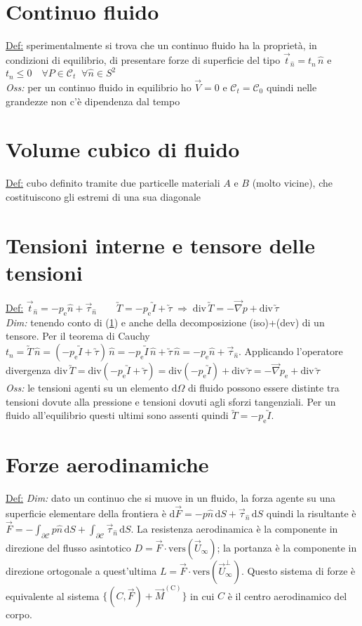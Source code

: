 \documentclass[11pt,a4paper]{report}
\newcommand{\de}{\mathrm d}
\begin{document}
	\section{Continuo fluido} \label{fluido}
	\underline{Def:} sperimentalmente si trova che un continuo fluido ha la proprietà, in condizioni di equilibrio, di presentare forze di superficie del tipo $\vec t_{\hat n}=t_{\hat n}\,\hat n$ e $t_{\hat n}\leq 0\quad\forall P\in\mathcal C_t\;\;\forall \hat n\in S^2$\\
	\textit{Oss:} per un continuo fluido in equilibrio ho $\vec V=0$ e $\mathcal C_t=\mathcal C_0$ quindi nelle grandezze non c'è dipendenza dal tempo
	
	\section{Volume cubico di fluido}
	\underline{Def:} cubo definito tramite due particelle materiali $A$ e $B$ (molto vicine), che costituiscono gli estremi di una sua diagonale
	
	\section{Tensioni interne e tensore delle tensioni}	\label{tensioni fluido}
	\underline{Def:} $\vec t_{\hat n}=-p_\mathrm e \hat n+\vec\tau_{\hat n}\qquad
	\utilde T=-p_\mathrm e\utilde I+\utilde\tau\;\Rightarrow\;\mathrm{div}\,\utilde T=-\vec\nabla p+\mathrm{div}\,\utilde\tau$\\
	\textit{Dim:} tenendo conto di (\ref{fluido}) e anche della decomposizione (iso)+(dev) di un tensore. Per il teorema di Cauchy\\$t_{\hat n}=\utilde T\,\hat n=(-p_\mathrm e\utilde I+\utilde\tau)\,\hat n=-p_\mathrm e\utilde I\,\hat n+\utilde\tau\,\hat n=-p_\mathrm e\hat n+\vec\tau_{\hat n}$. Applicando l'operatore divergenza $\mathrm{div}\,\utilde T=\mathrm{div}(-p_\mathrm e\utilde I+\utilde\tau)=\mathrm{div}(-p_\mathrm e\utilde I)+\mathrm{div}\,\utilde\tau=-\vec\nabla p_\mathrm e+\mathrm{div}\,\utilde\tau$\\
	\textit{Oss:}  le tensioni agenti su un elemento $\de \Omega$ di fluido possono essere distinte tra tensioni dovute alla pressione e tensioni dovuti agli sforzi tangenziali. Per un fluido all'equilibrio questi ultimi sono assenti quindi $\utilde T=-p_\mathrm e\utilde I$.
	
	\section{Forze aerodinamiche}
	\underline{Def:} 
	\textit{Dim:} dato un continuo che si muove in un fluido, la forza agente su una superficie elementare della frontiera è $\de \vec F=-p\hat n\,\de S+\vec\tau_{\hat n}\,\de S$ quindi la risultante è $\vec F=-\int_{\partial\mathcal C}p\hat n\,\de S+\int_{\partial\mathcal C}\vec\tau_{\hat n}\,\de S$. La resistenza aerodinamica è la componente in direzione del flusso asintotico $D=\vec F\cdot\mathrm{vers}(\vec U_\infty)$; la portanza è la componente  in direzione ortogonale a quest'ultima $L=\vec F\cdot\mathrm{vers}(\vec U_\infty^\perp)$. Questo sistema di forze è equivalente al sistema $\{(C,\vec F)+\vec M^{(\mathrm C)}\}$ in cui $C$ è il centro aerodinamico del corpo.
\end{document}
